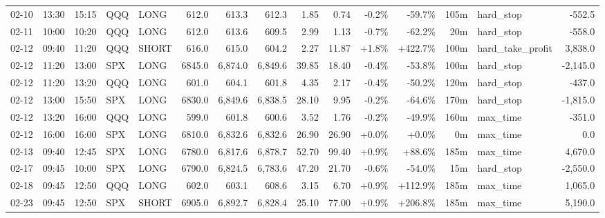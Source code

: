 \documentclass[11pt,a4paper,twoside]{article}
\begin{document}
\begin{landscape}
\begin{center}
\begin{longtable}{>{\color{txtmain}}l l l l l r r r r r r r r >{\color{txtmain}}l r}
02-10 & 13:30 & 15:15 & QQQ & LONG & 612.0 & 613.3 & 612.3 & 1.85 & 0.74 & \textcolor{lossred}{-0.2\%} & \textcolor{lossred}{-59.7\%} & 105m & hard\_stop & \textcolor{lossred}{-552.5} \\
02-11 & 10:00 & 10:20 & QQQ & LONG & 612.0 & 613.6 & 609.5 & 2.99 & 1.13 & \textcolor{lossred}{-0.7\%} & \textcolor{lossred}{-62.2\%} & 20m & hard\_stop & \textcolor{lossred}{-558.0} \\
02-12 & 09:40 & 11:20 & QQQ & SHORT & 616.0 & 615.0 & 604.2 & 2.27 & 11.87 & \textcolor{wingreen}{+1.8\%} & \textcolor{wingreen}{+422.7\%} & 100m & hard\_take\_profit & \textcolor{wingreen}{3,838.0} \\
02-12 & 11:20 & 13:00 & SPX & LONG & 6845.0 & 6,874.0 & 6,849.6 & 39.85 & 18.40 & \textcolor{lossred}{-0.4\%} & \textcolor{lossred}{-53.8\%} & 100m & hard\_stop & \textcolor{lossred}{-2,145.0} \\
02-12 & 11:20 & 13:20 & QQQ & LONG & 601.0 & 604.1 & 601.8 & 4.35 & 2.17 & \textcolor{lossred}{-0.4\%} & \textcolor{lossred}{-50.2\%} & 120m & hard\_stop & \textcolor{lossred}{-437.0} \\
02-12 & 13:00 & 15:50 & SPX & LONG & 6830.0 & 6,849.6 & 6,838.5 & 28.10 & 9.95 & \textcolor{lossred}{-0.2\%} & \textcolor{lossred}{-64.6\%} & 170m & hard\_stop & \textcolor{lossred}{-1,815.0} \\
02-12 & 13:20 & 16:00 & QQQ & LONG & 599.0 & 601.8 & 600.6 & 3.52 & 1.76 & \textcolor{lossred}{-0.2\%} & \textcolor{lossred}{-49.9\%} & 160m & max\_time & \textcolor{lossred}{-351.0} \\
02-12 & 16:00 & 16:00 & SPX & LONG & 6810.0 & 6,832.6 & 6,832.6 & 26.90 & 26.90 & \textcolor{wingreen}{+0.0\%} & \textcolor{wingreen}{+0.0\%} & 0m & max\_time & \textcolor{wingreen}{0.0} \\
02-13 & 09:40 & 12:45 & SPX & LONG & 6780.0 & 6,817.6 & 6,878.7 & 52.70 & 99.40 & \textcolor{wingreen}{+0.9\%} & \textcolor{wingreen}{+88.6\%} & 185m & max\_time & \textcolor{wingreen}{4,670.0} \\
02-17 & 09:45 & 10:00 & SPX & LONG & 6790.0 & 6,824.5 & 6,783.6 & 47.20 & 21.70 & \textcolor{lossred}{-0.6\%} & \textcolor{lossred}{-54.0\%} & 15m & hard\_stop & \textcolor{lossred}{-2,550.0} \\
02-18 & 09:45 & 12:50 & QQQ & LONG & 602.0 & 603.1 & 608.6 & 3.15 & 6.70 & \textcolor{wingreen}{+0.9\%} & \textcolor{wingreen}{+112.9\%} & 185m & max\_time & \textcolor{wingreen}{1,065.0} \\
02-23 & 09:45 & 12:50 & SPX & SHORT & 6905.0 & 6,892.7 & 6,828.4 & 25.10 & 77.00 & \textcolor{wingreen}{+0.9\%} & \textcolor{wingreen}{+206.8\%} & 185m & max\_time & \textcolor{wingreen}{5,190.0} \\

\end{longtable}
\end{center}
\end{landscape}
\end{document}
